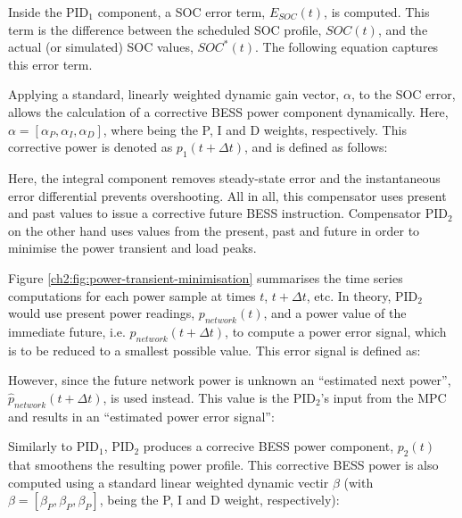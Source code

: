 Inside the PID$_1$ component, a SOC error term, $E_{SOC}(t)$, is computed.
This term is the difference between the scheduled SOC profile, $SOC(t)$, and the actual (or simulated) SOC values, $SOC^*(t)$.
The following equation captures this error term.



Applying a standard, linearly weighted dynamic gain vector, $\alpha$, to the SOC error, allows the calculation of a corrective BESS power component dynamically.
Here, $\alpha = [\alpha_P, \alpha_I, \alpha_D]$, where being the P, I and D weights, respectively.
This corrective power is denoted as $p_1(t+\Delta t)$, and is defined as follows:



Here, the integral component removes steady-state error and the instantaneous error differential prevents overshooting.
All in all, this compensator uses present and past values to issue a corrective future BESS instruction.
Compensator PID$_2$ on the other hand uses values from the present, past and future in order to minimise the power transient and load peaks.



Figure \ref{ch2:fig:power-transient-minimisation} summarises the time series computations for each power sample at times $t$, $t+\Delta t$, etc.
In theory, PID$_2$ would use present power readings, $p_{network}(t)$, and a power value of the immediate future, i.e. $p_{network}(t+\Delta t)$, to compute a power error signal, which is to be reduced to a smallest possible value.
This error signal is defined as:



However, since the future network power is unknown an ``estimated next power'', $\hat{p}_{network}(t+\Delta t)$, is used instead.
This value is the PID$_2$'s input from the MPC and results in an ``estimated power error signal'':



Similarly to PID$_1$, PID$_2$ produces a correcive BESS power component, $p_2(t)$ that smoothens the resulting power profile.
This corrective BESS power is also computed using a standard linear weighted dynamic vectir $\beta$ (with $\beta = [\beta_P, \beta_P, \beta_P]$, being the P, I and D weight, respectively):



